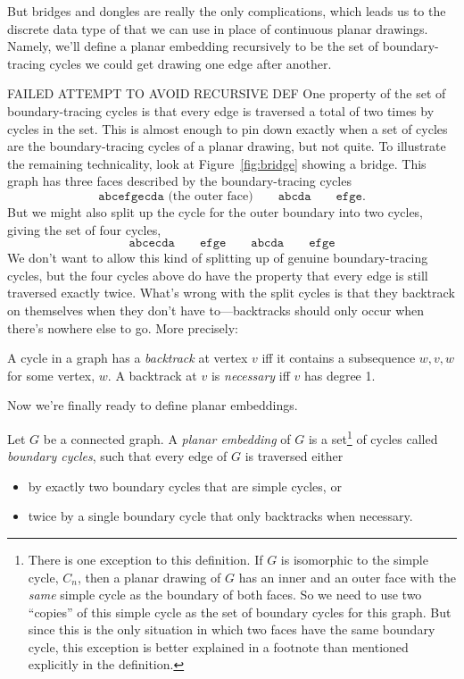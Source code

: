 But bridges and dongles are really the only complications, which leads
us to the discrete data type of  that we can use
in place of continuous planar drawings.  Namely, we'll define a planar
embedding recursively to be the set of boundary-tracing cycles we could
get drawing one edge after another.

\iffalse  FAILED ATTEMPT TO AVOID RECURSIVE DEF
One property of the set of boundary-tracing cycles is that every
edge is traversed a total of two times by cycles in the set.  This is
almost enough to pin down exactly when a set of cycles are the
boundary-tracing cycles of a planar drawing, but not quite.  To illustrate
the remaining technicality, look at Figure~\ref{fig:bridge} showing a
bridge.  This graph has three faces described by the boundary-tracing
cycles
\[
\mathtt{abcefgecda} \text{ (the outer face)} \qquad \mathtt{abcda}\qquad
\mathtt{efge}.
\]
But we might also split up the cycle for the outer boundary into two
cycles, giving the set of four cycles,
\[
\mathtt{abcecda}\qquad \mathtt{efge} \qquad \mathtt{abcda}\qquad
\mathtt{efge}
\]
We don't want to allow this kind of splitting up of genuine
boundary-tracing cycles, but the four cycles above do have the
property that every edge is still traversed exactly twice.  What's
wrong with the split cycles is that they backtrack on themselves when
they don't have to---backtracks should only occur when there's nowhere
else to go.  More precisely:
\begin{definition}
A cycle in a graph has a \emph{backtrack} at vertex $v$ iff it contains a
subsequence $w,v,w$ for some vertex, $w$.  A backtrack at $v$ is
\emph{necessary} iff $v$ has degree 1.
\end{definition}
Now we're finally ready to define planar embeddings.

Let $G$ be a connected graph.  A \emph{planar embedding} of $G$ is a
set\footnote{\label{C} There is one exception to this definition.  If $G$
is isomorphic to the simple cycle, $C_n$, then a planar drawing of $G$ has
an inner and an outer face with the \emph{same} simple cycle as the
boundary of both faces.  So we need to use two ``copies'' of this simple
cycle as the set of boundary cycles for this graph.  But since this is the
only situation in which two faces have the same boundary cycle, this
exception is better explained in a footnote than mentioned explicitly in
the definition.} of cycles called \emph{boundary cycles}, such that
every edge of $G$ is traversed either
\begin{itemize}
\item by exactly two boundary cycles that are simple cycles, or

\item twice by a single boundary cycle that only backtracks when
necessary.
\end{itemize}


